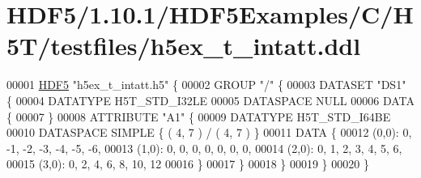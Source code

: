 \hypertarget{_h_d_f5_21_810_81_2_h_d_f5_examples_2_c_2_h5_t_2testfiles_2h5ex__t__intatt_8ddl_source}{}\section{H\+D\+F5/1.10.1/\+H\+D\+F5\+Examples/\+C/\+H5\+T/testfiles/h5ex\+\_\+t\+\_\+intatt.ddl}
\label{_h_d_f5_21_810_81_2_h_d_f5_examples_2_c_2_h5_t_2testfiles_2h5ex__t__intatt_8ddl_source}

\begin{DoxyCode}
00001 \hyperlink{namespace_h_d_f5}{HDF5} \textcolor{stringliteral}{"h5ex\_t\_intatt.h5"} \{
00002 GROUP \textcolor{stringliteral}{"/"} \{
00003    DATASET \textcolor{stringliteral}{"DS1"} \{
00004       DATATYPE  H5T\_STD\_I32LE
00005       DATASPACE  NULL
00006       DATA \{
00007       \}
00008       ATTRIBUTE \textcolor{stringliteral}{"A1"} \{
00009          DATATYPE  H5T\_STD\_I64BE
00010          DATASPACE  SIMPLE \{ ( 4, 7 ) / ( 4, 7 ) \}
00011          DATA \{
00012          (0,0): 0, -1, -2, -3, -4, -5, -6,
00013          (1,0): 0, 0, 0, 0, 0, 0, 0,
00014          (2,0): 0, 1, 2, 3, 4, 5, 6,
00015          (3,0): 0, 2, 4, 6, 8, 10, 12
00016          \}
00017       \}
00018    \}
00019 \}
00020 \}
\end{DoxyCode}
